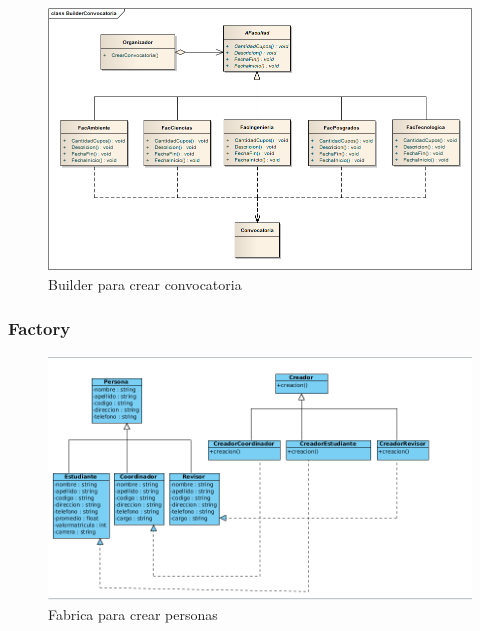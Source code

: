 \begin{figure}[th!]
	\centering
	\includegraphics[width=1.2\linewidth]{uml/Patrones/BuilderConvocatoria}
	\caption{Builder para crear convocatoria}
	\label{fig:Builder para convocatoria}
\end{figure}

\clearpage

\subsubsection{Factory}
\begin{figure}[th!]
	\centering
	\includegraphics[width=1.2\linewidth]{uml/Patrones/FactoryMethod}
	\caption{Fabrica para crear personas}
	\label{fig:Fabrica para crear personas}
\end{figure}

\clearpage

